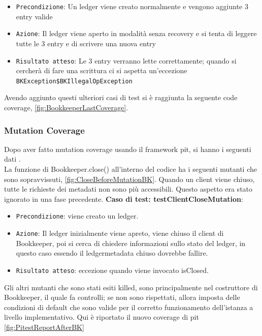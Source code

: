 \documentclass[10pt]{article}
\begin{document}
{\begin{itemize}[label=--, itemsep=2pt, parsep=0pt]
			\item \texttt{Precondizione}: Un ledger viene creato normalmente e vengono aggiunte 3 entry valide
			\item \texttt{Azione}: Il ledger viene aperto in modalità senza recovery e si tenta di leggere tutte le 3 entry e di scrivere una nuova entry
			\item \texttt{Risultato atteso}: Le 3 entry verranno lette correttamente; quando si cercherà di fare una scrittura ci si aspetta un'eccezione \texttt{BKException\$BKIllegalOpException}
		\end{itemize}
		Avendo aggiunto questi ulteriori casi di test si è raggiunta la seguente code coverage, \autoref{fig:BookkeeperLastCoverage}.
		\newpage
		\subsubsection{Mutation Coverage}
		Dopo aver fatto mutation coverage usando il framework pit, si hanno i seguenti dati .\\
		La funzione di Bookkeeper.close() all'interno del codice ha i seguenti mutanti che sono sopravvissuti, \autoref{fig:CloseBeforeMutationBK}. Quando un client viene chiuso, tutte le richieste dei metadati non sono più accessibili. Questo aspetto era stato ignorato in una fase precedente.
		\textbf{Caso di test: testClientCloseMutation}: 
		\begin{itemize}[label=--, itemsep=2pt, parsep=0pt]
			\item \texttt{Precondizione}: viene creato un ledger.
			\item \texttt{Azione}: Il ledger inizialmente viene apreto, viene chiuso il client di Bookkeeper, poi si cerca di chiedere informazioni sullo stato del ledger, in questo caso essendo il ledgermetadata chiuso dovrebbe fallire.
			\item \texttt{Risultato atteso}: eccezione quando viene invocato isClosed.
		\end{itemize}
		Gli altri mutanti che sono stati esiti killed, sono principalmente nel costruttore di Bookkeeper, il quale fa controlli; se non sono rispettati, allora imposta delle condizioni di default che sono valide per il corretto funzionamento dell'istanza a livello implementativo. Qui è riportato il nuovo coverage di pit \autoref{fig:PitestReportAfterBK}
}
\end{document}
